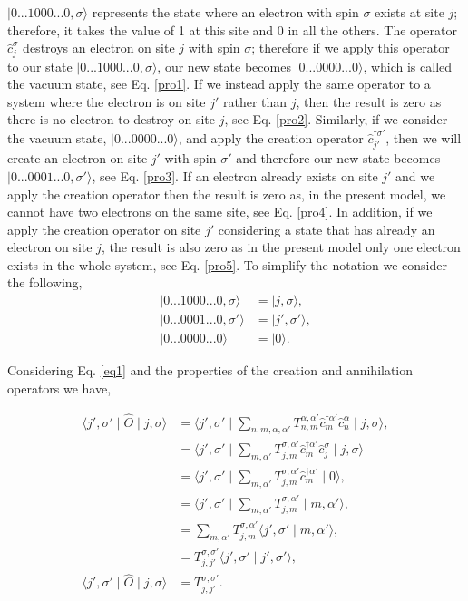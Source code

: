 \documentclass[10pt,prb,showpacs,amssymb,floatfix]{revtex4-1}
\begin{document}
$\mid 0...1 0 0 0...0 , \sigma \rangle$ represents the state where an electron with spin $\sigma$ exists at site $j$; therefore, it takes the value of 1 at this site and 0 in all the others. The operator $\hat{c}^\sigma_j$ destroys an electron on site $j$ with spin $\sigma$; therefore if we apply this operator to our state $\mid 0...1 0 0 0...0 , \sigma \rangle$, our new state becomes $ \mid 0...0 0 0 0...0 \rangle$, which is called the vacuum state, see Eq. \eqref{pro1}. If we instead apply the same operator to a system where the electron is on site $j'$ rather than $j$, then the result is zero as there is no electron to destroy on site $j$, see Eq. \eqref{pro2}. Similarly, if we consider the vacuum state, $ \mid 0...0 0 0 0...0 \rangle$, and apply the creation operator $\hat{c}_{j'}^{\dagger \sigma'}$, then we will create an electron on site $j'$ with spin $\sigma'$ and therefore our new state becomes $\mid 0...0 0 0 1...0, \sigma' \rangle$, see Eq. \eqref{pro3}. If an electron already exists on site $j'$ and we apply the creation operator then the result is zero as, in the present model, we cannot have two electrons on the same site, see Eq. \eqref{pro4}. In addition, if we apply the creation operator on site $j'$ considering a state that has already an electron on site $j$, the result is also zero as in the present model only one electron exists in the whole system, see Eq. \eqref{pro5}.  To simplify the notation we consider the following,
\begin{align}
\mid 0...1 0 0 0...0 , \sigma \rangle &= \mid j , \sigma \rangle, \\
\mid 0...0 0 0 1...0 , \sigma' \rangle  &=  \mid j' , \sigma' \rangle, \\
\mid 0...0 0 0 0...0 \rangle  &=  \mid 0 \rangle.
\end{align}


Considering Eq. \eqref{eq1} and the properties of the creation and annihilation operators we have, 

\begin{align}
\langle j',\sigma' \mid \hat{O} \mid j, \sigma \rangle &= \langle j',\sigma' \mid \sum_{n,m,\alpha,\alpha'} T_{n,m}^{\alpha,\alpha'} \hat{c}_m^{\dagger \alpha'} \hat{c}^\alpha_n \mid j, \sigma \rangle, \\
&= \langle j',\sigma' \mid \sum_{m,\alpha'} T_{j,m}^{\sigma,\alpha'} \hat{c}_m^{\dagger \alpha'} \hat{c}^\sigma_j \mid j, \sigma \rangle \\
&= \langle j',\sigma' \mid \sum_{m,\alpha'} T_{j,m}^{\sigma,\alpha'} \hat{c}_m^{\dagger \alpha'} \mid 0 \rangle, \\
&= \langle j',\sigma' \mid \sum_{m,\alpha'} T_{j,m}^{\sigma,\alpha'}  \mid m, \alpha' \rangle, \\
&= \sum_{m,\alpha'} T_{j,m}^{\sigma,\alpha'} \langle j',\sigma' \mid m, \alpha' \rangle, \\
&= T_{j,j'}^{\sigma,\sigma'} \langle j',\sigma' \mid j', \sigma' \rangle, \\
\langle j',\sigma' \mid \hat{O} \mid j, \sigma \rangle &= T_{j,j'}^{\sigma,\sigma'}.
\label{matel2} 
\end{align}
\end{document}
